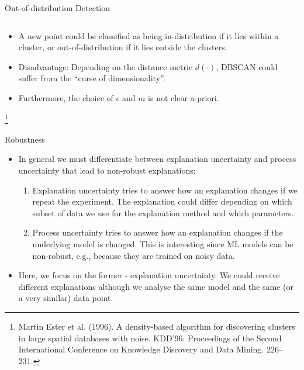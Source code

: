 \documentclass[11pt,compress,t,notes=noshow, xcolor=table]{beamer}
\begin{document}
\begin{frame}{Out-of-distribution Detection}
\begin{columns}
\begin{column}{0.27\textwidth}
\begin{center}
		\end{center}
	\end{column}
\end{columns}
\begin{itemize}
		\item A new point could be classified as being in-distribution if it lies within a cluster, or out-of-distribution if it lies outside the clusters. 
		\item Disadvantage: Depending on the distance metric $d(\cdot)$, DBSCAN could suffer from the ``curse of dimensionality''. 
		\item Furthermore, the choice of $\epsilon$ and $m$ is not clear a-priori. 
\end{itemize}
	\footnote[frame]{Martin Ester et al. (1996). A density-based algorithm for discovering clusters in large spatial databases with noise. KDD'96: Proceedings of the Second International Conference on Knowledge Discovery and Data Mining. 226–231.}
\end{frame}

\begin{vbframe}{Robustness}
		\begin{itemize}
		\item In general we must differentiate between explanation uncertainty and process uncertainty that lead to non-robust explanations: 
		\begin{enumerate}
			\item Explanation uncertainty tries to answer how an explanation changes if we repeat the experiment. The explanation could differ depending on which subset of data we use for the explanation method and which parameters. 
			\item Process uncertainty tries to answer how an explanation changes if the underlying model is changed. This is interesting since ML models can be non-robust, e.g., because they are trained on noisy data. 
		\end{enumerate}
		\item Here, we focus on the former - explanation uncertainty. We could receive different explanations although we analyse the same model and the same (or a very similar) data point.
	\end{itemize}
\end{vbframe}
\end{document}
